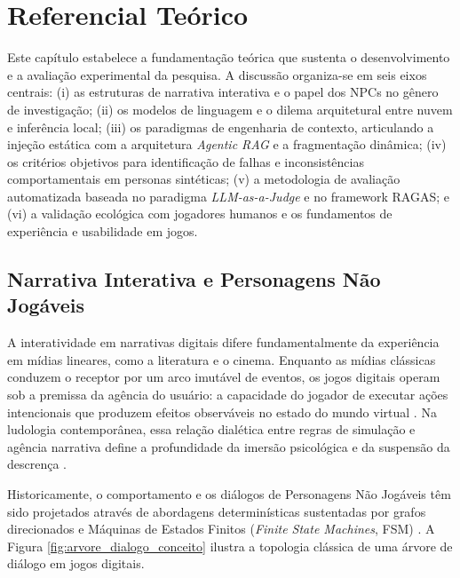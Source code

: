 \chapter{Referencial Teórico}
\label{cap:referencial}

Este capítulo estabelece a fundamentação teórica que sustenta o desenvolvimento e a avaliação experimental da pesquisa. A discussão organiza-se em seis eixos centrais: (i) as estruturas de narrativa interativa e o papel dos NPCs no gênero de investigação; (ii) os modelos de linguagem e o dilema arquitetural entre nuvem e inferência local; (iii) os paradigmas de engenharia de contexto, articulando a injeção estática com a arquitetura \textit{Agentic RAG} e a fragmentação dinâmica; (iv) os critérios objetivos para identificação de falhas e inconsistências comportamentais em personas sintéticas; (v) a metodologia de avaliação automatizada baseada no paradigma \textit{LLM-as-a-Judge} e no framework RAGAS; e (vi) a validação ecológica com jogadores humanos e os fundamentos de experiência e usabilidade em jogos.

\section{Narrativa Interativa e Personagens Não Jogáveis}
\label{sec:ref_narrativa}

A interatividade em narrativas digitais difere fundamentalmente da experiência em mídias lineares, como a literatura e o cinema. Enquanto as mídias clássicas conduzem o receptor por um arco imutável de eventos, os jogos digitais operam sob a premissa da agência do usuário: a capacidade do jogador de executar ações intencionais que produzem efeitos observáveis no estado do mundo virtual \cite{murray1997hamlet,ryan2006interactive}. Na ludologia contemporânea, essa relação dialética entre regras de simulação e agência narrativa define a profundidade da imersão psicológica e da suspensão da descrença \cite{frasca2003simulation,bowman2007virtual}.

Historicamente, o comportamento e os diálogos de Personagens Não Jogáveis têm sido projetados através de abordagens determinísticas sustentadas por grafos direcionados e Máquinas de Estados Finitos (\textit{Finite State Machines}, FSM) \cite{adams2014fundamentals}. A Figura \ref{fig:arvore_dialogo_conceito} ilustra a topologia clássica de uma árvore de diálogo em jogos digitais.

